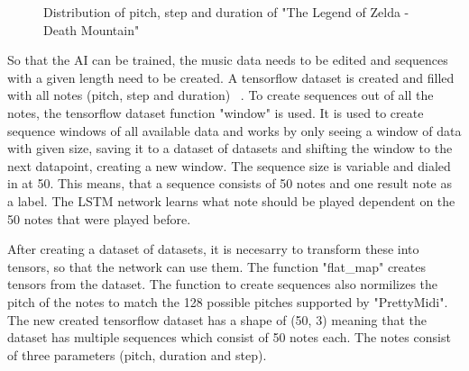 \begin{figure}

\caption{Distribution of pitch, step and duration of "The Legend of Zelda - Death Mountain"}
\label{fig:verteilung}   
\end{figure}

So that the AI can be trained, the music data needs to be edited and sequences with a given 
length need to be created. A tensorflow dataset is created and filled with all notes (pitch, step and duration) ~\cite{noauthor_generate_nodate}.
To create sequences out of all the notes, the tensorflow dataset function "window" is used. It is used to 
create sequence windows of all available data and works by only seeing a window of data with given size, saving
it to a dataset of datasets and shifting the window to the next datapoint, creating a new window.
The sequence size is variable and dialed in at 50. This means, that a sequence consists of 50 notes and 
one result note as a label. The LSTM network learns what note should be played dependent on the 50 notes that were
played before.


After creating a dataset of datasets, it is necesarry to transform these into tensors, so that the network can
use them. The function "flat\_map" creates tensors from the dataset. The function to create sequences also normilizes 
the pitch of the notes to match the 128 possible pitches supported by "PrettyMidi". The new created tensorflow dataset
has a shape of (50, 3) meaning that the dataset has multiple sequences which consist of 50 notes each. The notes consist
of three parameters (pitch, duration and step).

